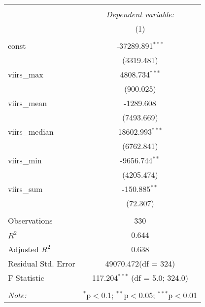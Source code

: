 \begin{table}[!htbp] \centering
\begin{tabular}{@{\extracolsep{5pt}}lc}
\\[-1.8ex]\hline
\hline \\[-1.8ex]
& \multicolumn{1}{c}{\textit{Dependent variable:}} \
\cr \cline{1-2}
\\[-1.8ex] & (1) \\
\hline \\[-1.8ex]
 const & -37289.891$^{***}$ \\
  & (3319.481) \\
 viirs_max & 4808.734$^{***}$ \\
  & (900.025) \\
 viirs_mean & -1289.608$^{}$ \\
  & (7493.669) \\
 viirs_median & 18602.993$^{***}$ \\
  & (6762.841) \\
 viirs_min & -9656.744$^{**}$ \\
  & (4205.474) \\
 viirs_sum & -150.885$^{**}$ \\
  & (72.307) \\
\hline \\[-1.8ex]
 Observations & 330 \\
 $R^2$ & 0.644 \\
 Adjusted $R^2$ & 0.638 \\
 Residual Std. Error & 49070.472(df = 324)  \\
 F Statistic & 117.204$^{***}$ (df = 5.0; 324.0) \\
\hline
\hline \\[-1.8ex]
\textit{Note:} & \multicolumn{1}{r}{$^{*}$p$<$0.1; $^{**}$p$<$0.05; $^{***}$p$<$0.01} \\
\end{tabular}
\end{table}